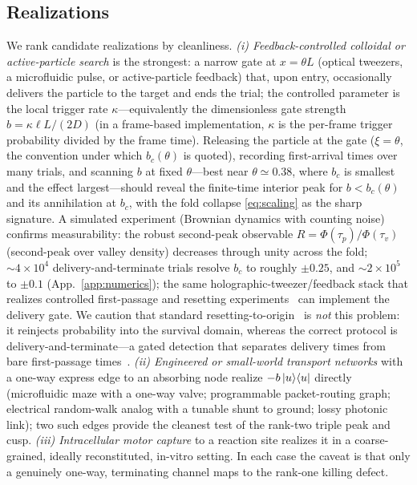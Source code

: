 \documentclass[reprint,amsmath,amssymb,aps,prresearch,longbibliography]{revtex4-2}
\begin{document}
\subsection{Realizations}\label{sec:physB}
We rank candidate realizations by cleanliness. \emph{(i) Feedback-controlled colloidal or
active-particle search} is the strongest: a narrow gate at $x=\theta L$ (optical tweezers, a
microfluidic pulse, or active-particle feedback) that, upon entry, occasionally delivers the particle
to the target and ends the trial; the controlled parameter is the local trigger rate
$\kappa$---equivalently the dimensionless gate strength $b=\kappa\ell L/(2D)$ (in a frame-based
implementation, $\kappa$ is the per-frame trigger probability divided by the frame time). Releasing
the particle at the gate
($\xi=\theta$, the convention under which $b_c(\theta)$ is quoted), recording first-arrival times over
many trials, and scanning $b$ at fixed $\theta$---best near $\theta\simeq0.38$, where $b_c$ is smallest
and the effect largest---should reveal the finite-time interior peak for $b<b_c(\theta)$ and its
annihilation at
$b_c$, with the fold collapse \eqref{eq:scaling} as the sharp signature. A simulated experiment
(Brownian dynamics with counting noise) confirms measurability: the robust second-peak observable
$R=\Phi(\tau_p)/\Phi(\tau_v)$ (second-peak over valley density) decreases through unity across the
fold; $\sim\!4\times10^4$ delivery-and-terminate trials resolve $b_c$ to roughly $\pm0.25$, and
$\sim\!2\times10^5$ to $\pm0.1$
(App.~\ref{app:numerics}); the same holographic-tweezer/feedback stack that realizes controlled
first-passage and resetting experiments~\cite{TalFriedman2020} can implement the delivery gate. We
caution that standard resetting-to-origin~\cite{TalFriedman2020,PalReuveni2017} is \emph{not} this problem: it
reinjects probability into the survival domain, whereas the correct protocol is
delivery-and-terminate---a gated detection that separates delivery times from bare first-passage
times~\cite{Kumar2023}. \emph{(ii) Engineered or small-world transport
networks} with a one-way express edge to an absorbing node realize $-b\ket{u}\!\bra{u}$ directly
(microfluidic maze with a one-way valve; programmable packet-routing graph; electrical random-walk
analog with a tunable shunt to ground; lossy photonic link); two such edges provide the cleanest test
of the rank-two triple peak and cusp. \emph{(iii) Intracellular motor capture} to a reaction site
realizes it in a coarse-grained, ideally reconstituted, in-vitro setting. In each case the caveat is
that only a genuinely one-way, terminating channel maps to the rank-one killing defect.
\end{document}
